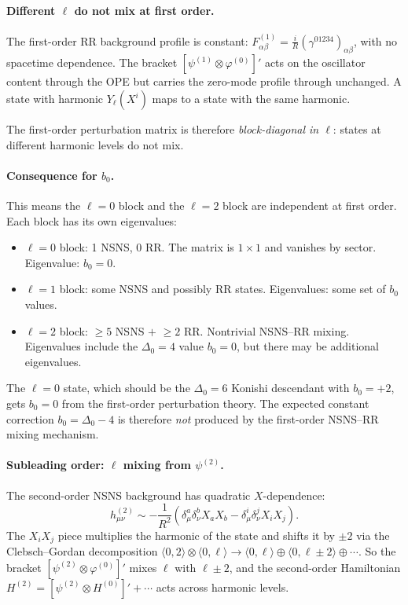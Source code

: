 \documentclass[12pt]{article}
\def\be{\begin{equation}}
\def\ee{\end{equation}}
\newcommand{\D}{\ensuremath{\Delta}}
\begin{document}
\paragraph{Different $\ell$ do not mix at first order.}
The first-order RR background profile is constant:
$F^{(1)}_{\alpha\beta}=\frac{i}{R}(\gamma^{01234})_{\alpha\beta}$,
with no spacetime dependence. The bracket $[\psi^{(1)}\otimes\varphi^{(0)}]'$ acts on
the oscillator content through the OPE but carries the zero-mode profile through unchanged.
A state with harmonic $Y_\ell(X^i)$ maps to a state with the same harmonic.

The first-order perturbation matrix is therefore \emph{block-diagonal in $\ell$}:
states at different harmonic levels do not mix.

\paragraph{Consequence for $b_0$.}
This means the $\ell=0$ block and the $\ell=2$ block are independent at first order.
Each block has its own eigenvalues:
\begin{itemize}
\item $\ell=0$ block: 1 NSNS, 0 RR. The matrix is $1\times 1$ and vanishes by sector.
Eigenvalue: $b_0=0$.
\item $\ell=1$ block: some NSNS and possibly RR states. Eigenvalues: some set of $b_0$ values.
\item $\ell=2$ block: $\geq 5$ NSNS $+$ $\geq 2$ RR. Nontrivial NSNS--RR mixing. Eigenvalues
include the $\D_0=4$ value $b_0=0$, but there may be additional eigenvalues.
\end{itemize}

The $\ell=0$ state, which should be the $\D_0=6$ Konishi descendant with $b_0=+2$, gets
$b_0=0$ from the first-order perturbation theory. The expected constant correction
$b_0=\D_0-4$ is therefore \emph{not} produced by the first-order NSNS--RR mixing mechanism.

\paragraph{Subleading order: $\ell$ mixing from $\psi^{(2)}$.}
The second-order NSNS background has quadratic $X$-dependence:
\be
h^{(2)}_{\mu\nu}\sim -\frac{1}{R^2}(\delta^a_\mu\delta^b_\nu X_aX_b
-\delta^i_\mu\delta^j_\nu X_iX_j).
\ee
The $X_iX_j$ piece multiplies the harmonic of the state and shifts it by $\pm 2$ via the
Clebsch--Gordan decomposition $\langle 0,2\rangle\otimes\langle 0,\ell\rangle
\to\langle 0,\ell\rangle\oplus\langle 0,\ell\pm 2\rangle\oplus\cdots$.
So the bracket $[\psi^{(2)}\otimes\varphi^{(0)}]'$ mixes $\ell$ with $\ell\pm 2$, and the
second-order Hamiltonian $H^{(2)}=[\psi^{(2)}\otimes H^{(0)}]'+\cdots$ acts across harmonic levels.
\end{document}
